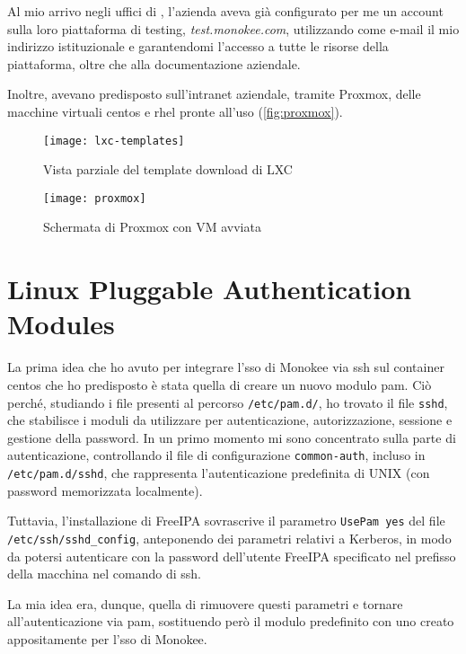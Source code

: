 Al mio arrivo negli uffici di \myAzienda, l'azienda aveva già configurato per me un account sulla loro piattaforma di testing, \emph{test.monokee.com}, utilizzando come e-mail il mio indirizzo istituzionale e garantendomi l'accesso a tutte le risorse della piattaforma, oltre che alla documentazione aziendale.

Inoltre, avevano predisposto sull'intranet aziendale, tramite Proxmox, delle macchine virtuali \acrshort{centos} e \acrshort{rhel} pronte all'uso (\autoref{fig:proxmox}).

\begin{figure}[H] 
    \centering 
    \texttt{[image: lxc-templates]} 
    \caption{Vista parziale del template download di LXC}
    \label{fig:lxc-template}
\end{figure}

\vspace{1cm}

\begin{figure}[H] 
    \centering 
    \texttt{[image: proxmox]} 
    \caption{Schermata di Proxmox con VM avviata}
    \label{fig:proxmox}
\end{figure}
\section{Linux Pluggable Authentication Modules}
\label{sec:tecnologie-strumenti}

La prima idea che ho avuto per integrare l'\acrshort{sso} di Monokee via \acrshort{ssh} sul container \acrshort{centos} che ho predisposto è stata quella di creare un nuovo modulo \acrshort{pam}. Ciò perché, studiando i file presenti al percorso \texttt{/etc/pam.d/}, ho trovato il file \texttt{sshd}, che stabilisce i moduli da utilizzare per autenticazione, autorizzazione, sessione e gestione della password. In un primo momento mi sono concentrato sulla parte di autenticazione, controllando il file di configurazione \texttt{common-auth}, incluso in \texttt{/etc/pam.d/sshd}, che rappresenta l'autenticazione predefinita di UNIX (con password memorizzata localmente). 

Tuttavia, l'installazione di FreeIPA sovrascrive il parametro \texttt{UsePam yes} del file \texttt{/etc/ssh/sshd\_config}, anteponendo dei parametri relativi a Kerberos, in modo da potersi autenticare con la password dell'utente FreeIPA specificato nel prefisso della macchina nel comando di \acrshort{ssh}.

La mia idea era, dunque, quella di rimuovere questi parametri e tornare all'autenticazione via \acrshort{pam}, sostituendo però il modulo predefinito con uno creato appositamente per l'\acrshort{sso} di Monokee.

